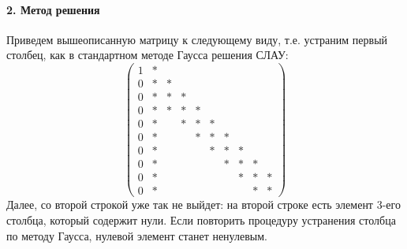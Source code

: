 \documentclass[11pt,a4paper,twoside]{report}
\begin{document}
\paragraph{2. Метод решения}
Приведем вышеописанную матрицу к следующему виду, т.е. устраним первый
столбец, как в стандартном методе Гаусса решения СЛАУ: 
\[
	\begin{pmatrix}
		1 & * &  &   &   &   &   &   &   &   \\
		0 & * & * &   &   &   &   &   &   &   \\
		0 & * & * & * &   &   &   &   &   &   \\
		0 & * & * & * & * &   &   &   &   &   \\
		0 & * &   & * & * & * &   &   &   &   \\
		0 & * &   &   & * & * & * &   &   &   \\
		0 & * &   &   &   & * & * & * &   &   \\
		0 & * &   &   &   &   & * & * & * &   \\
		0 & * &   &   &   &   &   & * & * & * \\
		0 & * &   &   &   &   &   &   & * & * 
	\end{pmatrix}
\] 
Далее, со второй строкой уже так не выйдет: на второй строке есть
элемент 3-его столбца, который содержит нули. Если повторить процедуру
устранения столбца по методу Гаусса, нулевой элемент станет ненулевым.
\end{document}
